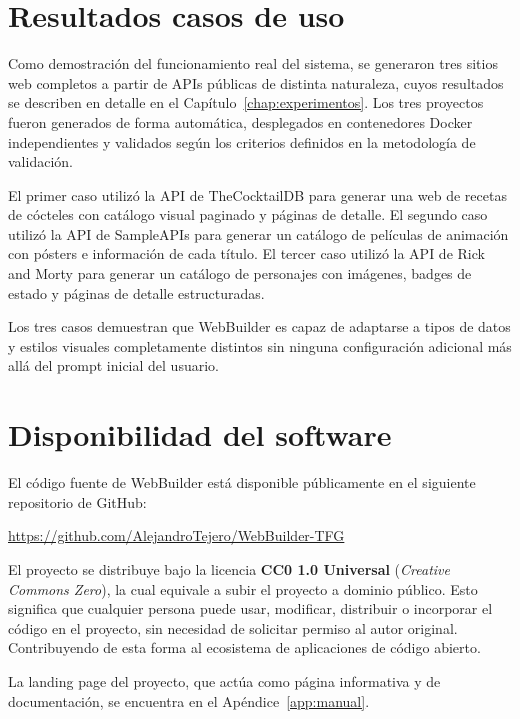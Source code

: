 \section{Resultados casos de uso}
\label{sec:casos-uso-resultados}

Como demostración del funcionamiento real del sistema, se generaron tres sitios web completos a partir de APIs públicas de distinta naturaleza, cuyos resultados se describen en detalle en el Capítulo~\ref{chap:experimentos}. Los tres proyectos fueron generados de forma automática, desplegados en contenedores Docker independientes y validados según los criterios definidos en la metodología de validación.

El primer caso utilizó la API de TheCocktailDB para generar una web de recetas de cócteles con catálogo visual paginado y páginas de detalle. El segundo caso utilizó la API de SampleAPIs para generar un catálogo de películas de animación con pósters e información de cada título. El tercer caso utilizó la API de Rick and Morty para generar un catálogo de personajes con imágenes, badges de estado y páginas de detalle estructuradas.

Los tres casos demuestran que WebBuilder es capaz de adaptarse a tipos de datos y estilos visuales completamente distintos sin ninguna configuración adicional más allá del prompt inicial del usuario.

\section{Disponibilidad del software}
\label{sec:disponibilidad}

El código fuente de WebBuilder está disponible públicamente en el 
siguiente repositorio de GitHub:

\begin{center}
\url{https://github.com/AlejandroTejero/WebBuilder-TFG}
\end{center}

El proyecto se distribuye bajo la licencia \textbf{CC0 1.0 Universal} 
(\emph{Creative Commons Zero}), la cual equivale a subir el proyecto a dominio público. Esto 
significa que cualquier persona puede usar, modificar, distribuir o 
incorporar el código en el proyecto, sin necesidad de solicitar permiso al autor original. Contribuyendo de esta forma al ecosistema de aplicaciones de código abierto.

La landing page del proyecto, que actúa como página informativa y de documentación, 
se encuentra en el Apéndice~\ref{app:manual}.